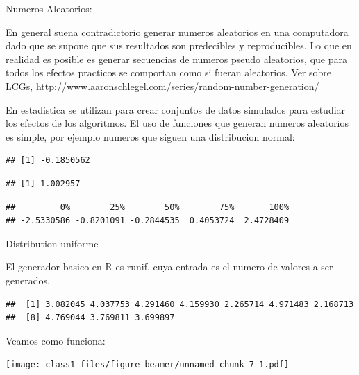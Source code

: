 \documentclass[ignorenonframetext,]{beamer}
\begin{document}
\begin{frame}[fragile]{Numeros Aleatorios:}

En general suena contradictorio generar numeros aleatorios en una
computadora dado que se supone que sus resultados son predecibles y
reproducibles. Lo que en realidad es posible es generar secuencias de
numeros pseudo aleatorios, que para todos los efectos practicos se
comportan como si fueran aleatorios. Ver sobre LCGs,
\url{http://www.aaronschlegel.com/series/random-number-generation/}

En estadistica se utilizan para crear conjuntos de datos simulados para
estudiar los efectos de los algoritmos. El uso de funciones que generan
numeros aleatorios es simple, por ejemplo numeros que siguen una
distribucion normal:

\begin{verbatim}
## [1] -0.1850562
\end{verbatim}

\begin{verbatim}
## [1] 1.002957
\end{verbatim}

\begin{verbatim}
##         0%        25%        50%        75%       100% 
## -2.5330586 -0.8201091 -0.2844535  0.4053724  2.4728409
\end{verbatim}

\end{frame}

\begin{frame}[fragile]

\begin{block}{Distribution uniforme}

El generador basico en R es runif, cuya entrada es el numero de valores
a ser generados.

\begin{verbatim}
##  [1] 3.082045 4.037753 4.291460 4.159930 2.265714 4.971483 2.168713
##  [8] 4.769044 3.769811 3.699897
\end{verbatim}

Veamos como funciona:

\texttt{[image: class1\_files/figure-beamer/unnamed-chunk-7-1.pdf]}

\end{block}

\end{frame}
\end{document}
